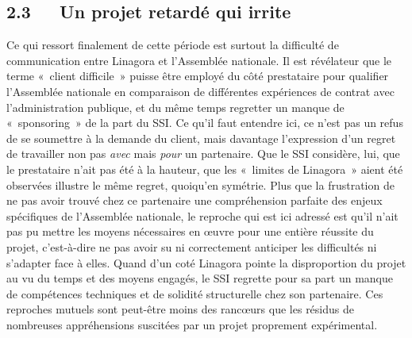 \documentclass{FramateX}
\begin{document}
\begin{refsection}
\subsection*{2.3~~~Un projet retardé qui irrite}
{}

Ce qui ressort finalement de cette période est surtout la difficulté de
communication entre Linagora et l'Assemblée nationale. Il est
révélateur que le terme «~client difficile~» puisse être employé du
côté prestataire pour qualifier l'Assemblée nationale en comparaison de
différentes expériences de contrat avec l'administration publique, et
du même temps regretter un manque de «~sponsoring~» de la part du SSI.
Ce qu'il faut entendre ici, ce n'est pas un refus de se soumettre à la
demande du client, mais davantage l'expression d'un regret de
travailler non pas \textit{avec} mais \textit{pour} un partenaire. Que
le SSI considère, lui, que le prestataire n'ait pas été à la hauteur,
que les «~limites de Linagora~» aient été observées illustre le même
regret, quoiqu'en symétrie. Plus que la frustration de ne pas avoir
trouvé chez ce partenaire une compréhension parfaite des enjeux
spécifiques de l'Assemblée nationale, le reproche qui est ici adressé
est qu'il n'ait pas pu mettre les moyens nécessaires en œuvre pour une
entière réussite du projet, c'est-à-dire ne pas avoir su ni
correctement anticiper les difficultés ni s'adapter face à elles. Quand
d'un coté Linagora pointe la disproportion du projet au vu du temps et
des moyens engagés, le SSI regrette pour sa part un manque de
compétences techniques et de solidité structurelle chez son partenaire.
Ces reproches mutuels sont peut-être moins des rancœurs que les résidus
de nombreuses appréhensions suscitées par un projet proprement
expérimental. 


\end{refsection}
\end{document}
